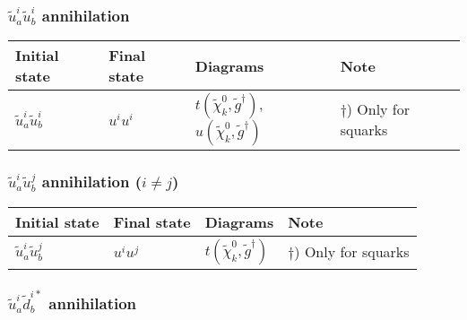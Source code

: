 \subsubsection{$\tilde{u}^i_a \tilde{u}^{i}_b$ annihilation}

\begin{center}
\begin{tabular}{llll} \hline
{\bfseries Initial state} & {\bfseries Final state} &
{\bfseries Diagrams} & {\bfseries Note} \\ \hline \tabspace
$\tilde{u}^i_a\tilde{u}^{i}_b$ & $u^i u^i$ &
$t(\tilde{\chi}_{k}^0,\tilde{g}^\dagger)$, $u(\tilde{\chi}_{k}^0,\tilde{g}^\dagger)$ 
& $\dagger$) Only for squarks \\ \hline
\end{tabular}
\end{center}

\subsubsection{$\tilde{u}^i_a \tilde{u}^{j}_b$ annihilation ($i \ne j$)}

\begin{center}
\begin{tabular}{llll} \hline
{\bfseries Initial state} & {\bfseries Final state} &
{\bfseries Diagrams} & {\bfseries Note} \\ \hline \tabspace
$\tilde{u}^i_a \tilde{u}^{j}_b$ & $u^i u^j$ &
$t(\tilde{\chi}_{k}^0,\tilde{g}^\dagger)$
& $\dagger$) Only for squarks \\ \hline
\end{tabular}
\end{center}

\subsubsection{$\tilde{u}^i_a \tilde{d}_{b}^{i*}$ annihilation}

